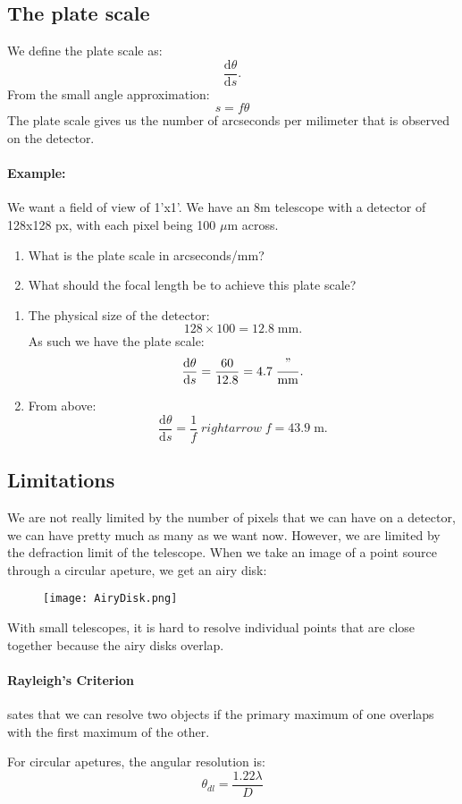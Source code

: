 \subsection{The plate scale}
We define the plate scale as:
$$
	\frac{\mathrm{d}\theta}{\mathrm{d}s}.
$$
From the small angle approximation:
$$
	s = f \theta
$$
The plate scale gives us the number of arcseconds per milimeter that is observed
on the detector.

\paragraph{Example:} We want a field of view of 1'x1'. We have an 8m telescope
with a detector of 128x128 px, with each pixel being 100 $\mu$m across.

\begin{enumerate}
	\item What is the plate scale in arcseconds/mm?
	\item What should the focal length be to achieve this plate scale?
\end{enumerate}

\begin{enumerate}
	\item The physical size of the detector: 
	$$
		128 \times 100 = 12.8 \; \mathrm{mm}.
	$$
	As such we have the plate scale:
	$$
		\frac{\mathrm{d}\theta}{\mathrm{d}s} = \frac{60}{12.8} = 4.7 \;
		\frac{"}{\mathrm{mm}}.
	$$
	\item From above:
	$$
		\frac{\mathrm{d}\theta}{\mathrm{d}s} = \frac{1}{f} \; rightarrow \;
		f = 43.9 \; \mathrm{m}.
	$$
\end{enumerate}
\subsection{Limitations}
We are not really limited by the number of pixels that we can have on a
detector, we can have pretty much as many as we want now. However, we are
limited by the defraction limit of the telescope. When we take an image of a
point source through a circular apeture, we get an airy disk:
\begin{figure}[h!]
	\centering
	\texttt{[image: AiryDisk.png]}
\end{figure}
With small telescopes, it is hard to resolve individual points that are close
together because the airy disks overlap.
\paragraph{Rayleigh's Criterion} sates that we can resolve two objects if the
primary maximum of one overlaps with the first maximum of the other.

For circular apetures, the angular resolution is:
$$
	\theta_{dl} = \frac{1.22 \lambda}{D}
$$


